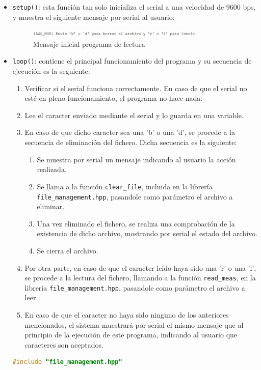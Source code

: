 \begin{itemize}
    \item \texttt{setup()}: esta función tan solo inicializa el serial a una velocidad de 9600 bps, y muestra el siguiente mensaje por serial al usuario:
    \begin{figure}[H]
        \centering
        \includegraphics[width=0.8\textwidth]{images/3-software/3-4-readfile/MensajeInicial.png}
        \caption{Mensaje inicial programa de lectura}
        \label{fig:3-4-1-MensajeInicial}
    \end{figure}
    \item \texttt{loop()}: contiene el principal funcionamiento del programa y su secuencia de ejecución es la seguiente:
    \begin{enumerate}
        \item Verificar si el serial funciona correctamente. En caso de que el serial no esté en pleno funcionamiento, el programa no hace nada.
        \item Lee el caracter enviado mediante el serial y lo guarda en una variable.
        \item En caso de que dicho caracter sea una 'b' o una 'd', se procede a la secuencia de eliminación del fichero. Dicha secuencia es la siguiente:
        \begin{enumerate}
            \item Se muestra por serial un mensaje indicando al usuario la acción realizada.
            \item Se llama a la función \texttt{clear\_file}, incluida en la librería \texttt{file\_management.hpp}, pasandole como parámetro el archivo a eliminar.
            \item Una vez eliminado el fichero, se realiza una comprobación de la existencia de dicho archivo, mostrando por serial el estado del archivo.
            \item Se cierra el archivo.
        \end{enumerate}
        \item Por otra parte, en caso de que el caracter leído haya sido una 'r' o una 'l', se procede a la lectura del fichero, llamando a la función \texttt{read\_meas}, en la librería \texttt{file\_management.hpp}, pasandole como parámetro el archivo a leer.
        \item En caso de que el caracter no haya sido ninguno de los anteriores mencionados, el sistema muestrará por serial el mismo mensaje que al principio de la ejecución de este programa, indicando al usuario que caracteres son aceptados.
    \end{enumerate}
    \begin{lstlisting}[captionpos=b, caption={Programa lectura o eliminación de fichero}, language=c++]
        #include "file_management.hpp"


\end{lstlisting}
\end{itemize}
